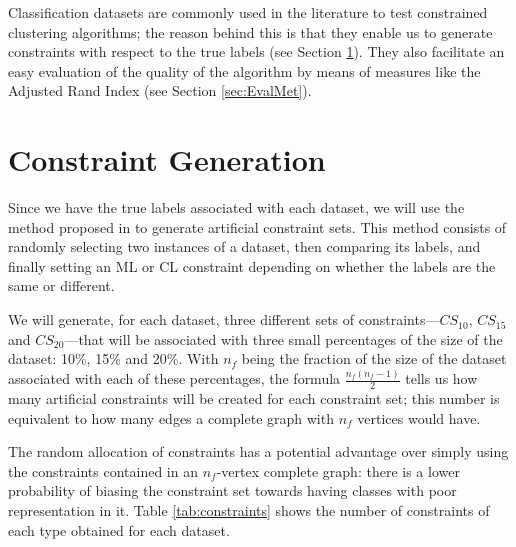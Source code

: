 Classification datasets are commonly used in the literature to test constrained clustering algorithms; the reason behind this is that they enable us to generate constraints with respect to the true labels (see Section \ref{sec:ConstGent}). They also facilitate an easy evaluation of the quality of the algorithm by means of measures like the Adjusted Rand Index (see Section \ref{sec:EvalMet}).

\section{Constraint Generation} \label{sec:ConstGent}

Since we have the true labels associated with each dataset, we will use the method proposed in \cite{wagstaff2001constrained} to generate artificial constraint sets. This method consists of randomly selecting two instances of a dataset, then comparing its labels, and finally setting an ML or CL constraint depending on whether the labels are the same or different.

We will generate, for each dataset, three different sets of constraints---$CS_{10}$, $CS_{15}$ and $CS_{20}$---that will be associated with three small percentages of the size of the dataset: 10\%, 15\% and 20\%. With $n_f$ being the fraction of the size of the dataset associated with each of these percentages, the formula $\frac{n_f(n_f-1)}{2}$ tells us how many artificial constraints will be created for each constraint set; this number is equivalent to how many edges a complete graph with $n_f$ vertices would have.

The random allocation of constraints has a potential advantage over simply using the constraints contained in an $n_f$-vertex complete graph: there is a lower probability of biasing the constraint set towards having classes with poor representation in it. Table \ref{tab:constraints} shows the number of constraints of each type obtained for each dataset.

